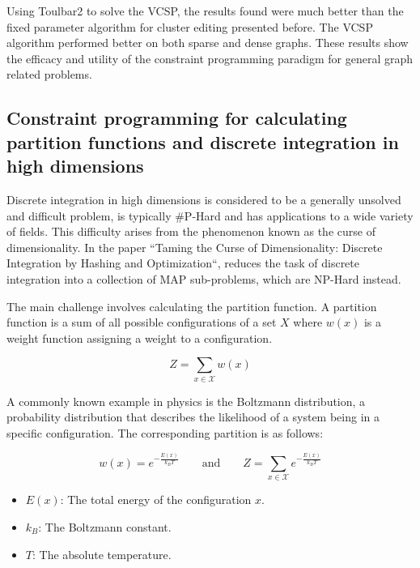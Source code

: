 \documentclass[runningheads]{llncs}
\begin{document}
Using Toulbar2 to solve the \ac{VCSP}, the results found were much better than the fixed parameter algorithm for cluster editing presented before. The \ac{VCSP} algorithm performed better on both sparse and dense graphs. These results show the efficacy and utility of the constraint programming paradigm for general graph related problems.

\subsection{Constraint programming for calculating partition functions and discrete integration in high dimensions}

Discrete integration in high dimensions is considered to be a generally unsolved and difficult problem, is typically \#P-Hard and has applications to a wide variety of fields. This difficulty arises from the phenomenon known as the curse of dimensionality. In the paper ``Taming the Curse of Dimensionality: Discrete Integration by Hashing and Optimization``\cite{ermon_taming_2013}, reduces the task of discrete integration into a collection of \ac{MAP} sub-problems, which are NP-Hard instead.

The main challenge involves calculating the partition function. A partition function is a sum of all possible configurations of a set $X$ where $w(x)$ is a weight function assigning a weight to a configuration.

\begin{equation}
    Z = \sum_{x \in \mathcal{X}} w(x)
\end{equation}

A commonly known example in physics is the Boltzmann distribution, a probability distribution that describes the likelihood of a system being in a specific configuration. The corresponding partition is as follows:

\begin{equation}
    w(x) = e^{-\frac{E(x)}{k_B T}} 
    \qquad \text{and} \qquad 
    Z = \sum_{x \in \mathcal{X}} e^{-\frac{E(x)}{k_B T}}
\end{equation}

\begin{itemize}
    \item $E(x)$: The total energy of the configuration $x$.
    \item $k_B$: The Boltzmann constant.
    \item $T$: The absolute temperature.
\end{itemize}
\end{document}

